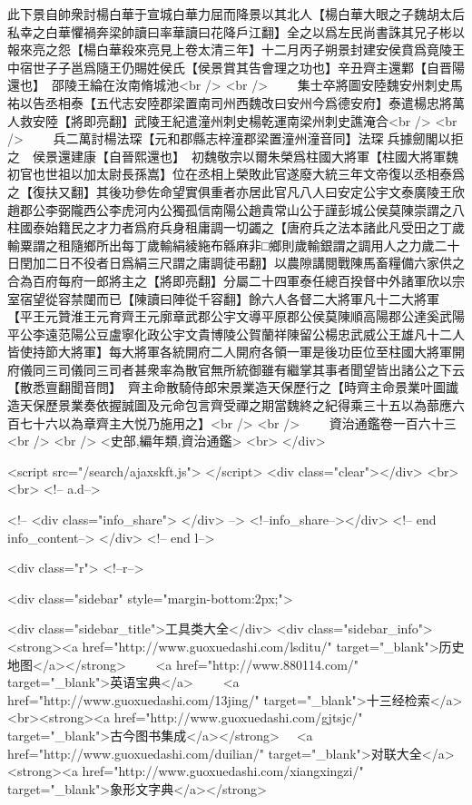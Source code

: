 此下景自帥衆討楊白華于宣城白華力屈而降景以其北人【楊白華大眼之子魏胡太后私幸之白華懼禍奔梁帥讀曰率華讀曰花降戶江翻】全之以爲左民尚書誅其兄子彬以報來亮之怨【楊白華殺來亮見上卷太清三年】十二月丙子朔景封建安侯賁爲竟陵王中宿世子子邕爲隨王仍賜姓侯氏【侯景賞其告會理之功也】辛丑齊主還鄴【自晋陽還也】　邵陵王綸在汝南脩城池<br />
<br />
　　集士卒將圖安陸魏安州刺史馬祐以告丞相泰【五代志安陸郡梁置南司州西魏改曰安州今爲德安府】泰遣楊忠將萬人救安陸【將即亮翻】武陵王紀遣潼州刺史楊乾運南梁州刺史譙淹合<br />
<br />
　　兵二萬討楊法琛【元和郡縣志梓潼郡梁置潼州潼音同】法琛兵據劒閣以拒之　侯景還建康【自晉熙還也】　初魏敬宗以爾朱榮爲柱國大將軍【柱國大將軍魏初官也世祖以加太尉長孫嵩】位在丞相上榮敗此官遂廢大統三年文帝復以丞相泰爲之【復扶又翻】其後功參佐命望實俱重者亦居此官凡八人曰安定公宇文泰廣陵王欣趙郡公李弼隴西公李虎河内公獨孤信南陽公趙貴常山公于謹彭城公侯莫陳崇謂之八柱國泰始籍民之才力者爲府兵身租庸調一切蠲之【唐府兵之法本諸此凡受田之丁歲輸粟謂之租隨鄉所出每丁歲輸絹綾絁布緜麻非□鄉則歲輸銀謂之調用人之力歲二十日閏加二日不役者日爲絹三尺謂之庸調徒弔翻】以農隙講閱戰陳馬畜糧備六家供之合為百府每府一郎將主之【將即亮翻】分屬二十四軍泰任總百揆督中外諸軍欣以宗室宿望從容禁闥而已【陳讀曰陣從千容翻】餘六人各督二大將軍凡十二大將軍　【平王元贊淮王元育齊王元廓章武郡公宇文導平原郡公侯莫陳順高陽郡公達奚武陽平公李遠范陽公豆盧寧化政公宇文貴博陵公賀蘭祥陳留公楊忠武威公王雄凡十二人皆使持節大將軍】每大將軍各統開府二人開府各領一軍是後功臣位至柱國大將軍開府儀同三司儀同三司者甚衆率為散官無所統御雖有繼掌其事者聞望皆出諸公之下云【散悉亶翻聞音問】　齊主命散騎侍郎宋景業造天保歷行之【時齊主命景業叶圖䜟造天保歷景業奏依握誠圖及元命包言齊受禪之期當魏終之紀得乘三十五以為蔀應六百七十六以為章齊主大悦乃施用之】<br />
<br />
　　資治通鑑卷一百六十三<br />
<br />
<史部,編年類,資治通鑑>  <br>
   </div> 

<script src="/search/ajaxskft.js"> </script>
 <div class="clear"></div>
<br>
<br>
 <!-- a.d-->

 <!--
<div class="info_share">
</div> 
-->
 <!--info_share--></div>   <!-- end info_content-->
  </div> <!-- end l-->

<div class="r">   <!--r-->



<div class="sidebar"  style="margin-bottom:2px;">

 
<div class="sidebar_title">工具类大全</div>
<div class="sidebar_info">
<strong><a href="http://www.guoxuedashi.com/lsditu/" target="_blank">历史地图</a></strong>　　
<a href="http://www.880114.com/" target="_blank">英语宝典</a>　　
<a href="http://www.guoxuedashi.com/13jing/" target="_blank">十三经检索</a>　
<br><strong><a href="http://www.guoxuedashi.com/gjtsjc/" target="_blank">古今图书集成</a></strong>　
<a href="http://www.guoxuedashi.com/duilian/" target="_blank">对联大全</a>　<strong><a href="http://www.guoxuedashi.com/xiangxingzi/" target="_blank">象形文字典</a></strong>　

